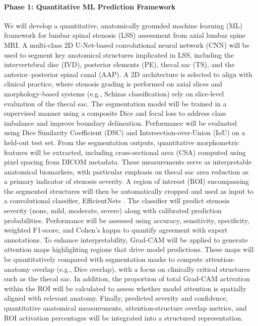 \documentclass[12pt]{article}
\begin{document}
\paragraph{Phase 1: Quantitative ML Prediction Framework}
We will develop a quantitative, anatomically grounded machine learning (ML) framework for lumbar spinal stenosis (LSS) assessment from axial lumbar spine MRI. A multi-class 2D U-Net-based convolutional neural network (CNN) \citep{ronneberger2015unetconvolutionalnetworksbiomedical} will be used to segment key anatomical structures implicated in LSS, including the intervertebral disc (IVD), posterior elements (PE), thecal sac (TS), and the anterior–posterior spinal canal (AAP). A 2D architecture is selected to align with clinical practice, where stenosis grading is performed on axial slices and morphology-based systems (e.g., Schizas classification) rely on slice-level evaluation of the thecal sac. The segmentation model will be trained in a supervised manner using a composite Dice and focal loss to address class imbalance and improve boundary delineation. Performance will be evaluated using Dice Similarity Coefficient (DSC) and Intersection-over-Union (IoU) on a held-out test set. From the segmentation outputs, quantitative morphometric features will be extracted, including cross-sectional area (CSA) computed using pixel spacing from DICOM metadata. These measurements serve as interpretable anatomical biomarkers, with particular emphasis on thecal sac area reduction as a primary indicator of stenosis severity.
A region of interest (ROI) encompassing the segmented structures will then be automatically cropped and used as input to a convolutional classifier, EfficientNets \citep{tan2020efficientnetrethinkingmodelscaling}. The classifier will predict stenosis severity (none, mild, moderate, severe) along with calibrated prediction probabilities. Performance will be assessed using accuracy, sensitivity, specificity, weighted F1-score, and Cohen’s kappa to quantify agreement with expert annotations. To enhance interpretability, Grad-CAM \citep{Selvaraju2019} will be applied to generate attention maps highlighting regions that drive model predictions. These maps will be quantitatively compared with segmentation masks to compute attention-anatomy overlap (e.g., Dice overlap), with a focus on clinically critical structures such as the thecal sac. In addition, the proportion of total Grad-CAM activation within the ROI will be calculated to assess whether model attention is spatially aligned with relevant anatomy. Finally, predicted severity and confidence, quantitative anatomical measurements, attention-structure overlap metrics, and ROI activation percentages will be integrated into a structured representation.
\end{document}
